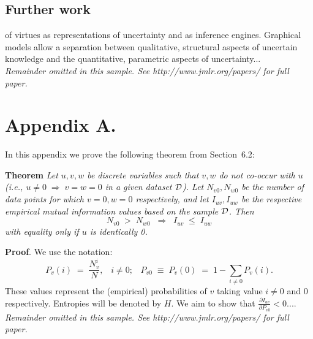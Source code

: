 \documentclass[twoside,11pt]{article}
\newcommand{\dataset}{{\cal D}}
\newcommand{\fracpartial}[2]{\frac{\partial #1}{\partial  #2}}
\begin{document}
\subsection{Further work}

of virtues as representations of uncertainty and as inference engines.  
Graphical models allow a separation between qualitative, structural
aspects of uncertain knowledge and the quantitative, parametric aspects 
of uncertainty...\\

{\noindent \em Remainder omitted in this sample. See http://www.jmlr.org/papers/ for full paper.}




\newpage

\appendix
\section*{Appendix A.}
\label{app:theorem}



In this appendix we prove the following theorem from
Section~6.2:

\noindent
{\bf Theorem} {\it Let $u,v,w$ be discrete variables such that $v, w$ do
not co-occur with $u$ (i.e., $u\neq0\;\Rightarrow \;v=w=0$ in a given
dataset $\dataset$). Let $N_{v0},N_{w0}$ be the number of data points for
which $v=0, w=0$ respectively, and let $I_{uv},I_{uw}$ be the
respective empirical mutual information values based on the sample
$\dataset$. Then
\[
	N_{v0} \;>\; N_{w0}\;\;\Rightarrow\;\;I_{uv} \;\leq\;I_{uw}
\]
with equality only if $u$ is identically 0.} \hfill\BlackBox

\noindent
{\bf Proof}. We use the notation:
\[
P_v(i) \;=\;\frac{N_v^i}{N},\;\;\;i \neq 0;\;\;\;
P_{v0}\;\equiv\;P_v(0)\; = \;1 - \sum_{i\neq 0}P_v(i).
\]
These values represent the (empirical) probabilities of $v$
taking value $i\neq 0$ and 0 respectively.  Entropies will be denoted
by $H$. We aim to show that $\fracpartial{I_{uv}}{P_{v0}} < 0$....\\

{\noindent \em Remainder omitted in this sample. See http://www.jmlr.org/papers/ for full paper.}


\vskip 0.2in

\end{document}
